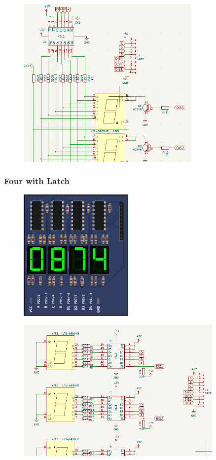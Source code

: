 \begin{figure}[H]
\center
\includegraphics[width=0.8\textwidth]{img/part_7seg_dec_.png} 
\end{figure} 

\subsubsection{Four with Latch}
\begin{figure}[H]
\center
\includegraphics[width=0.5\textwidth]{img/part_7seg_latch.png} 
\end{figure} 


\begin{figure}[H]
\center
\includegraphics[width=0.9\textwidth]{img/part_7seg_latch_.png} 
\end{figure} 

